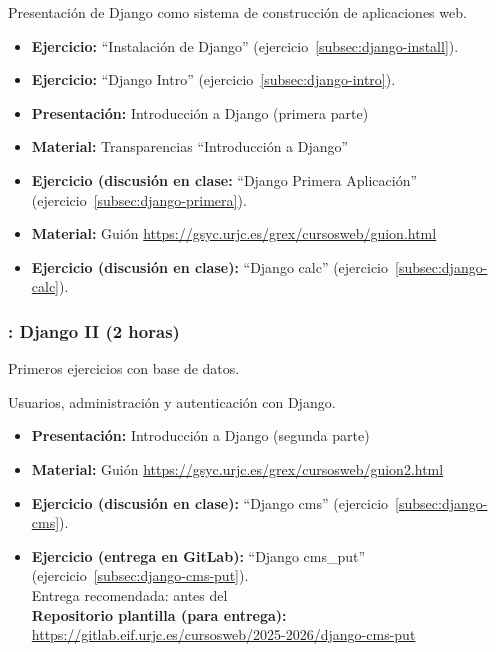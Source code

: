 \documentclass[a4paper,12pt]{article}
\begin{document}
Presentación de Django como sistema de construcción de aplicaciones web.

\begin{itemize}
 \item \textbf{Ejercicio:} ``Instalación de Django'' (ejercicio~\ref{subsec:django-install}).
 \item \textbf{Ejercicio:} ``Django Intro'' (ejercicio~\ref{subsec:django-intro}).
 \item \textbf{Presentación:} Introducción a Django (primera parte)
 \item \textbf{Material:} Transparencias ``Introducción a Django''
 \item \textbf{Ejercicio (discusión en clase:} ``Django Primera Aplicación'' (ejercicio~\ref{subsec:django-primera}).
 \item \textbf{Material:} Guión \url{https://gsyc.urjc.es/grex/cursosweb/guion.html}
 \item \textbf{Ejercicio (discusión en clase):} ``Django calc'' (ejercicio~\ref{subsec:django-calc}).
 \end{itemize}


\subsubsection{\juevesH: Django II (2 horas)}
\label{cal:juevesH}

Primeros ejercicios con base de datos.

Usuarios, administración y autenticación con Django.

\begin{itemize}
 \item \textbf{Presentación:} Introducción a Django (segunda parte)
  \item \textbf{Material:} Guión \url{https://gsyc.urjc.es/grex/cursosweb/guion2.html}
 \item \textbf{Ejercicio  (discusión en clase):} ``Django cms'' (ejercicio~\ref{subsec:django-cms}). \\
 \item \textbf{Ejercicio (entrega en GitLab):} ``Django cms\_put'' (ejercicio~\ref{subsec:django-cms-put}). \\
  Entrega recomendada: antes del \juevesI \\
  \textbf{Repositorio plantilla (para entrega):} \\
\url{https://gitlab.eif.urjc.es/cursosweb/2025-2026/django-cms-put}
\end{itemize}
\end{document}
